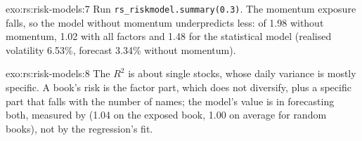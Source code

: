 \begin{solution}{exo:rs:risk-models:7}
Run \texttt{rs\_riskmodel.summary(0.3)}. The momentum exposure falls, so the model without momentum underpredicts less:  of 1.98
without momentum, 1.02 with all factors and 1.48 for the statistical model (realised volatility 6.53\%, forecast 3.34\% without momentum).
\end{solution}

\begin{solution}{exo:rs:risk-models:8}
The $R^2$ is about single stocks, whose daily variance is mostly specific. A book's risk is the factor part, which does not diversify, plus a specific part that
falls with the number of names; the model's value is in forecasting both, measured by  (1.04 on the exposed book, 1.00 on average for random books),
not by the regression's fit.
\end{solution}

